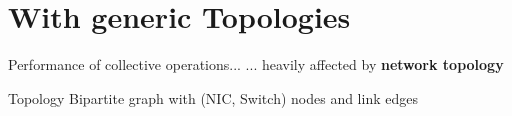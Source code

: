 \documentclass[xcolor={rgb,x11names,svgnames},rgb,x11names,svgnames]{beamer}
\begin{document}

\section{With generic Topologies}


\begin{frame}

  \vfill
  \large

  \begin{alertblock}{Performance of collective operations...}
    ... heavily affected by \textbf{network topology}
  \end{alertblock}

  \vfill

  \begin{block}{Topology}
    Bipartite graph with (NIC, Switch) nodes and link edges
  \end{block}

  \vfill
\end{frame}

\end{document}
